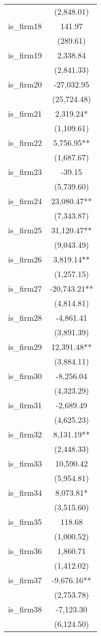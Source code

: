 \begin{tabular}{lc}
 & (2,848.01) \\
is\_firm18 & 141.97 \\
 & (289.61) \\
is\_firm19 & 2,338.84 \\
 & (2,841.33) \\
is\_firm20 & -27,032.95 \\
 & (25,724.48) \\
is\_firm21 & 2,319.24* \\
 & (1,109.61) \\
is\_firm22 & 5,756.95** \\
 & (1,687.67) \\
is\_firm23 & -39.15 \\
 & (5,739.60) \\
is\_firm24 & 23,080.47** \\
 & (7,343.87) \\
is\_firm25 & 31,120.47** \\
 & (9,043.49) \\
is\_firm26 & 3,819.14** \\
 & (1,257.15) \\
is\_firm27 & -20,743.21** \\
 & (4,814.81) \\
is\_firm28 & -4,861.41 \\
 & (3,891.39) \\
is\_firm29 & 12,391.48** \\
 & (3,884.11) \\
is\_firm30 & -8,256.04 \\
 & (4,323.29) \\
is\_firm31 & -2,689.49 \\
 & (4,625.23) \\
is\_firm32 & 8,131.19** \\
 & (2,448.33) \\
is\_firm33 & 10,590.42 \\
 & (5,954.81) \\
is\_firm34 & 8,073.81* \\
 & (3,515.60) \\
is\_firm35 & 118.68 \\
 & (1,000.52) \\
is\_firm36 & 1,860.71 \\
 & (1,412.02) \\
is\_firm37 & -9,676.16** \\
 & (2,753.78) \\
is\_firm38 & -7,123.30 \\
 & (6,124.50) \\

\end{tabular}
